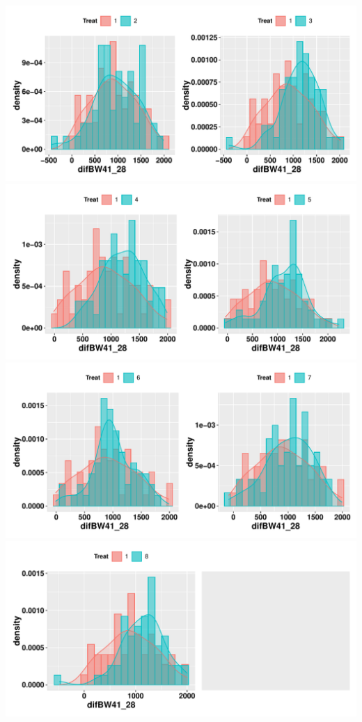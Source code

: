 \documentclass[
  11pt,
]{article}
\begin{document}
\includegraphics{def_files/figure-latex/unnamed-chunk-13-1.pdf}
\includegraphics{def_files/figure-latex/unnamed-chunk-13-2.pdf}
\includegraphics{def_files/figure-latex/unnamed-chunk-13-3.pdf}
\includegraphics{def_files/figure-latex/unnamed-chunk-13-4.pdf}
\end{document}
